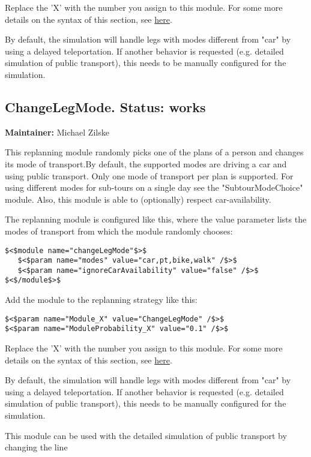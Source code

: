 \documentclass[a4paper,11pt]{report}
\begin{document}
Replace the 'X' with the number you assign to this module. For some more details on the syntax of this section, see \href{http://matsim.org/node/478}{here}.


By default, the simulation will handle legs with modes different from  "car" by using a delayed teleportation. If another behavior is  requested (e.g. detailed simulation of public transport), this needs to  be manually configured for the simulation.


\subsection{ChangeLegMode. Status: works}


\textbf{Maintainer:} Michael Zilske

This replanning module randomly picks one of the plans of a person  and changes its mode of transport.By default, the supported modes  are driving a car and using public transport. Only one mode of transport  per plan is supported. For using different modes for sub-tours on a  single day see the "SubtourModeChoice" module. Also, this module is able  to (optionally) respect car-availability.

The replanning module is configured like this, where the value  parameter lists the modes of transport from which the module randomly  chooses:
\begin{verbatim}
$<$module name="changeLegMode"$>$
   $<$param name="modes" value="car,pt,bike,walk" /$>$
   $<$param name="ignoreCarAvailability" value="false" /$>$
$<$/module$>$
\end{verbatim}

Add the module to the replanning strategy like this:
\begin{verbatim}
$<$param name="Module_X" value="ChangeLegMode" /$>$
$<$param name="ModuleProbability_X" value="0.1" /$>$
\end{verbatim}

Replace the 'X' with the number you assign to this module. For some more details on the syntax of this section, see \href{http://matsim.org/node/478}{here}.

By default, the simulation will handle legs with modes different from  "car" by using a delayed teleportation. If another behavior is  requested (e.g. detailed simulation of public transport), this needs to  be manually configured for the simulation.

This module can be used with the detailed simulation of public transport by changing the line
\end{document}
